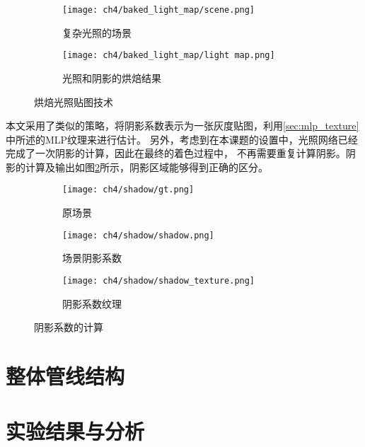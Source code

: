 \begin{figure}[H]
  \centering
  \begin{subfigure}[t]{0.45\textwidth}
    \centering
    \texttt{[image: ch4/baked\_light\_map/scene.png]}
    \caption{复杂光照的场景}
  \end{subfigure}
  \hspace{0.05\textwidth} %
  \begin{subfigure}[t]{0.45\textwidth}
    \centering
    \texttt{[image: ch4/baked\_light\_map/light map.png]}
    \caption{光照和阴影的烘焙结果}
  \end{subfigure}
  \caption{烘焙光照贴图技术}
  \label{fig:baked_light_map}
\end{figure}

本文采用了类似的策略，将阴影系数表示为一张灰度贴图，利用\ref{sec:mlp_texture}中所述的MLP纹理来进行估计。
另外，考虑到在本课题的设置中，光照网络已经完成了一次阴影的计算，因此在最终的着色过程中，
不再需要重复计算阴影。阴影的计算及输出如图\ref{fig:shadow_mapping}所示，阴影区域能够得到正确的区分。

\begin{figure}[H]
  \centering
  \begin{subfigure}[c]{0.27\textwidth}
    \centering
    \texttt{[image: ch4/shadow/gt.png]}
    \caption{原场景}
  \end{subfigure}
  \hspace{0.05\textwidth} %
  \begin{subfigure}[c]{0.27\textwidth}
    \centering
    \texttt{[image: ch4/shadow/shadow.png]}
    \caption{场景阴影系数}
  \end{subfigure}
  \hspace{0.05\textwidth} %
  \begin{subfigure}[c]{0.27\textwidth}
    \centering
    \texttt{[image: ch4/shadow/shadow\_texture.png]}
    \caption{阴影系数纹理}
  \end{subfigure}
  \caption{阴影系数的计算}
  \label{fig:shadow_mapping}
\end{figure}


\section{整体管线结构}

\section{实验结果与分析}

